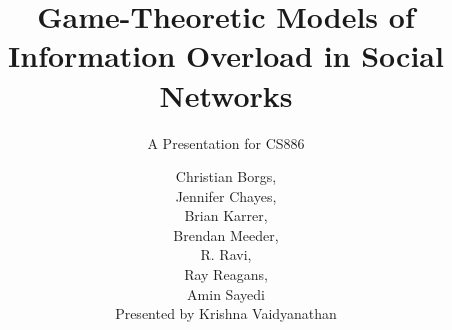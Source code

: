 \documentclass[aspectratio=169]{beamer}
\title{Game-Theoretic Models of Information Overload in Social Networks}
\subtitle{A Presentation for CS886}
\author[Presented by Krishna Vaidyanathan]{Christian Borgs,\\Jennifer
    Chayes,\\Brian Karrer,\\Brendan Meeder,\\R. Ravi,\\Ray Reagans,\\Amin
    Sayedi\\\vspace{2em}Presented by Krishna Vaidyanathan}
\newcommand{\bi}{\begin{itemize}}
\newcommand{\ei}{\end{itemize}}
\begin{document}
\frame[plain]{\titlepage}
\begin{frame}
    \bi
    \ei
\end{frame}
\end{document}

